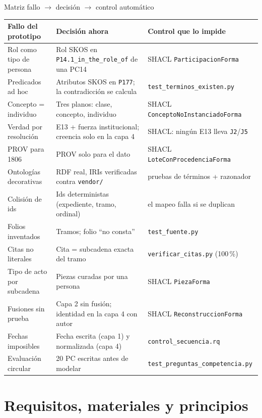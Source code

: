 \documentclass[aspectratio=169,10pt]{beamer}
\newcommand{\ttt}[1]{\texttt{\small #1}}
\begin{document}
\begin{frame}{Matriz fallo $\to$ decisión $\to$ control automático}
\scriptsize
\begin{tabular}{@{}p{3.3cm}p{5.3cm}p{4.6cm}@{}}
\toprule
Fallo del prototipo & Decisión ahora & Control que lo impide \\
\midrule
Rol como tipo de persona & Rol SKOS en \ttt{P14.1\_in\_the\_role\_of} de una PC14 & SHACL \ttt{ParticipacionForma} \\
Predicados ad hoc & Atributos SKOS en \ttt{P177}; la contradicción se calcula & \ttt{test\_terminos\_existen.py} \\
Concepto = individuo & Tres planos: clase, concepto, individuo & SHACL \ttt{ConceptoNoInstanciadoForma} \\
Verdad por resolución & E13 + fuerza institucional; creencia solo en la capa 4 & SHACL: ningún E13 lleva \ttt{J2}/\ttt{J5} \\
PROV para 1806 & PROV solo para el dato & SHACL \ttt{LoteConProcedenciaForma} \\
Ontologías decorativas & RDF real, IRIs verificadas contra \ttt{vendor/} & pruebas de términos + razonador \\
Colisión de ids & Ids deterministas (expediente, tramo, ordinal) & el mapeo falla si se duplican \\
Folios inventados & Tramos; folio \enquote{no consta} & \ttt{test\_fuente.py} \\
Citas no literales & Cita = subcadena exacta del tramo & \ttt{verificar\_citas.py} (100\,\%) \\
Tipo de acto por subcadena & Piezas curadas por una persona & SHACL \ttt{PiezaForma} \\
Fusiones sin prueba & Capa 2 sin fusión; identidad en la capa 4 con autor & SHACL \ttt{ReconstruccionForma} \\
Fechas imposibles & Fecha escrita (capa 1) y normalizada (capa 4) & \ttt{control\_secuencia.rq} \\
Evaluación circular & 20 PC escritas \alert{antes} de modelar & \ttt{test\_preguntas\_competencia.py} \\
\bottomrule
\end{tabular}
\end{frame}

\section{Requisitos, materiales y principios}
\end{document}
